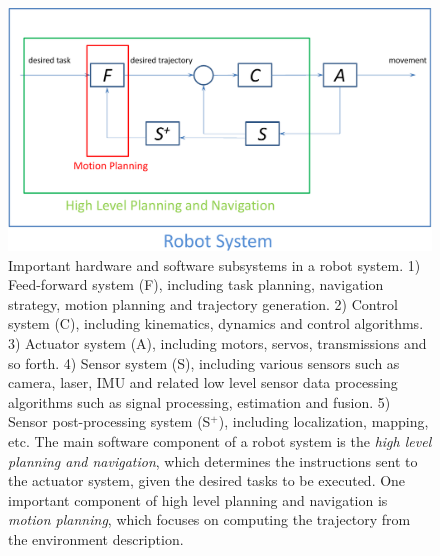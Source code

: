 \begin{figure}[htb]
  \centering
  \includegraphics[width=\linewidth]{figs/1/pipeline-crop.pdf}
  \caption[Important hardware and software subsystems in a robot system]{Important hardware and software subsystems in a robot system. 1) Feed-forward system (F), including task planning, navigation strategy, motion planning and trajectory generation. 2) Control system (C), including kinematics, dynamics and control algorithms. 3) Actuator system (A), including motors, servos, transmissions and so forth. 4) Sensor system (S), including various sensors such as camera, laser, IMU and related low level sensor data processing algorithms such as signal processing, estimation and fusion. 5) Sensor post-processing system (S$^+$), including localization, mapping, etc. The main software component of a robot system is the \emph{high level planning and navigation}, which determines the instructions sent to the actuator system, given the desired tasks to be executed. One important component of high level planning and navigation is \emph{motion planning}, which focuses on computing the trajectory from the environment description.}
  \label{fig:1:pipeline}
\end{figure}

